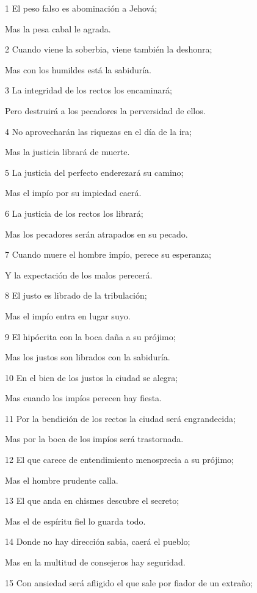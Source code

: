\par 1 El peso falso es abominación a Jehová;
\par Mas la pesa cabal le agrada.
\par 2 Cuando viene la soberbia, viene también la deshonra;
\par Mas con los humildes está la sabiduría.
\par 3 La integridad de los rectos los encaminará;
\par Pero destruirá a los pecadores la perversidad de ellos.
\par 4 No aprovecharán las riquezas en el día de la ira;
\par Mas la justicia librará de muerte.
\par 5 La justicia del perfecto enderezará su camino;
\par Mas el impío por su impiedad caerá.
\par 6 La justicia de los rectos los librará;
\par Mas los pecadores serán atrapados en su pecado.
\par 7 Cuando muere el hombre impío, perece su esperanza;
\par Y la expectación de los malos perecerá.
\par 8 El justo es librado de la tribulación;
\par Mas el impío entra en lugar suyo.
\par 9 El hipócrita con la boca daña a su prójimo;
\par Mas los justos son librados con la sabiduría.
\par 10 En el bien de los justos la ciudad se alegra;
\par Mas cuando los impíos perecen hay fiesta.
\par 11 Por la bendición de los rectos la ciudad será engrandecida;
\par Mas por la boca de los impíos será trastornada.
\par 12 El que carece de entendimiento menosprecia a su prójimo;
\par Mas el hombre prudente calla.
\par 13 El que anda en chismes descubre el secreto;
\par Mas el de espíritu fiel lo guarda todo.
\par 14 Donde no hay dirección sabia, caerá el pueblo;
\par Mas en la multitud de consejeros hay seguridad.
\par 15 Con ansiedad será afligido el que sale por fiador de un extraño;
